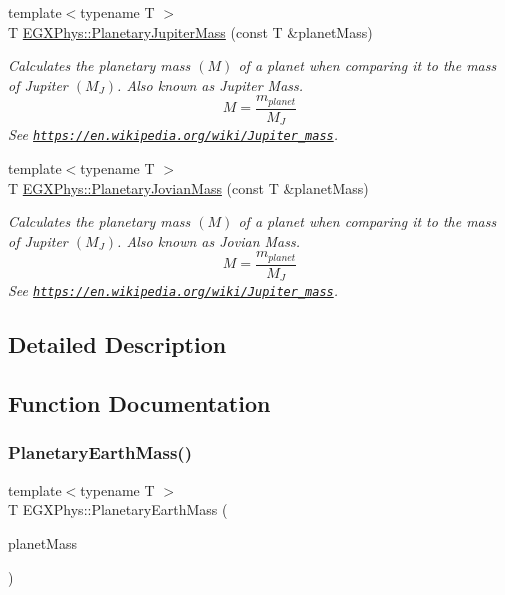 \begin{DoxyCompactItemize}
{\footnotesize template$<$typename T $>$ }\\T \mbox{\hyperlink{group___planetary_mass_gaadff5ffa04bb55a572c1403ab9500c06}{E\+G\+X\+Phys\+::\+Planetary\+Jupiter\+Mass}} (const T \&planet\+Mass)
\begin{DoxyCompactList}\small\item\em Calculates the planetary mass $(M)$ of a planet when comparing it to the mass of Jupiter $(M_J)$. Also known as Jupiter Mass. \[M=\frac{m_{planet}}{M_J}\] See \href{https://en.wikipedia.org/wiki/Jupiter_mass}{\tt https\+://en.\+wikipedia.\+org/wiki/\+Jupiter\+\_\+mass}. \end{DoxyCompactList}\item 
{\footnotesize template$<$typename T $>$ }\\T \mbox{\hyperlink{group___planetary_mass_ga4663e9388a3bd1a20f94beb52021f293}{E\+G\+X\+Phys\+::\+Planetary\+Jovian\+Mass}} (const T \&planet\+Mass)
\begin{DoxyCompactList}\small\item\em Calculates the planetary mass $(M)$ of a planet when comparing it to the mass of Jupiter $(M_J)$. Also known as Jovian Mass. \[M=\frac{m_{planet}}{M_J}\] See \href{https://en.wikipedia.org/wiki/Jupiter_mass}{\tt https\+://en.\+wikipedia.\+org/wiki/\+Jupiter\+\_\+mass}. \end{DoxyCompactList}\end{DoxyCompactItemize}


\subsection{Detailed Description}


\subsection{Function Documentation}
\mbox{\label{group___planetary_mass_ga3d918c2d37a72b42b49aa6c3da08f450}} 
\subsubsection{\texorpdfstring{Planetary\+Earth\+Mass()}{PlanetaryEarthMass()}}
{\footnotesize\ttfamily template$<$typename T $>$ \\
T E\+G\+X\+Phys\+::\+Planetary\+Earth\+Mass (\begin{DoxyParamCaption}\item[{const T \&}]{planet\+Mass }\end{DoxyParamCaption})}



